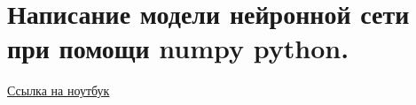 \section{Написание модели нейронной сети при помощи numpy python.}

\href{https://github.com/andriygav/School/blob/master/2018/AD/Lecture/Lecture11.ipynb}{Ссылка на ноутбук}
